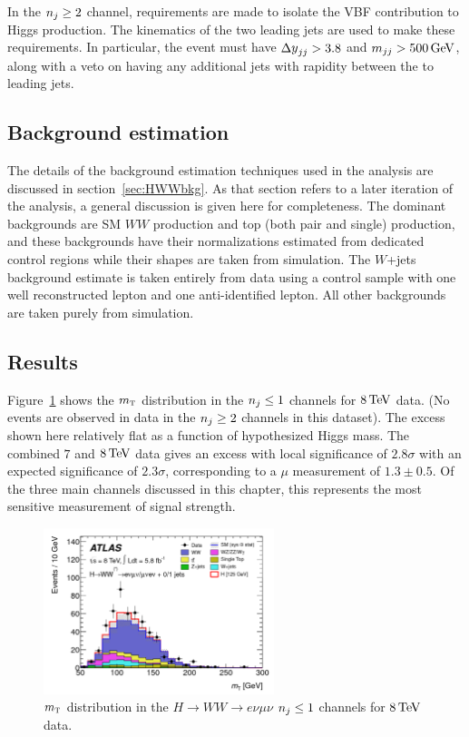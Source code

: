 In the $n_j \geq 2$ channel, requirements are made to isolate the VBF contribution to Higgs production. The kinematics of the two leading jets are used to make these requirements. In particular, the event must have $\dyjj > 3.8$ and $\mjj > 500 \GeV$, along with a veto on having any additional jets with rapidity between the to leading jets. 

\subsection{Background estimation}

The details of the background estimation techniques used in the \HWWfull analysis are discussed in section~\ref{sec:HWWbkg}. As that section refers to a later iteration of the analysis, a general discussion is given here for completeness. The dominant backgrounds are SM $WW$ production and top (both pair and single) production, and these backgrounds have their normalizations estimated from dedicated control regions while their shapes are taken from simulation. The $W$+jets background estimate is taken entirely from data using a control sample with one well reconstructed lepton and one anti-identified lepton. All other backgrounds are taken purely from simulation. 

\subsection{Results}

Figure~\ref{fig:disc_mt} shows the $m_{\textrm{\footnotesize\sc t}}$ distribution in the $n_j \leq 1$ channels for $8 \TeV$ data. (No events are observed in data in the $n_j \geq 2$ channels in this dataset). The excess shown here relatively flat as a function of hypothesized Higgs mass. The combined $7$ and $8\TeV$ data gives an excess with local significance of $2.8\sigma$ with an expected significance of $2.3\sigma$, corresponding to a $\mu$ measurement of $1.3\pm 0.5$. Of the three main channels discussed in this chapter, this represents the most sensitive measurement of signal strength. 

\begin{figure}[h!]
  \centering
  \captionsetup{justification=centering}
  \includegraphics[width=0.6\textwidth]{figures/discovery_mt}
  \caption{$m_{\textrm{\footnotesize\sc t}}$ distribution in the $H\to WW \to e\nu\mu\nu$ $n_j \leq 1$ channels for $8 \TeV$ data\cite{Discovery}.}
  \label{fig:disc_mt}
\end{figure}

